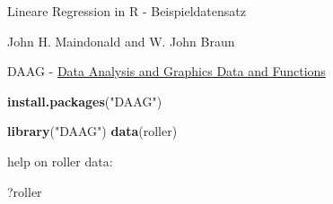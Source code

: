 \documentclass[ignorenonframetext,]{beamer}
\newenvironment{Shaded}{}{}
\newcommand{\KeywordTok}[1]{\textcolor[rgb]{0.00,0.44,0.13}{\textbf{{#1}}}}
\newcommand{\StringTok}[1]{\textcolor[rgb]{0.25,0.44,0.63}{{#1}}}
\newcommand{\NormalTok}[1]{{#1}}
\begin{document}
\begin{frame}[fragile]{Lineare Regression in R - Beispieldatensatz}

John H. Maindonald and W. John Braun

DAAG -
\href{http://cran.ms.unimelb.edu.au/web/packages/DAAG/DAAG.pdf}{Data
Analysis and Graphics Data and Functions}

\begin{Shaded}
\begin{Highlighting}[]
\KeywordTok{install.packages}\NormalTok{(}\StringTok{"DAAG"}\NormalTok{)}
\end{Highlighting}
\end{Shaded}

\begin{Shaded}
\begin{Highlighting}[]
\KeywordTok{library}\NormalTok{(}\StringTok{"DAAG"}\NormalTok{)}
\KeywordTok{data}\NormalTok{(roller)}
\end{Highlighting}
\end{Shaded}

help on roller data:

\begin{Shaded}
\begin{Highlighting}[]
\NormalTok{?roller}
\end{Highlighting}
\end{Shaded}

\end{frame}
\end{document}

